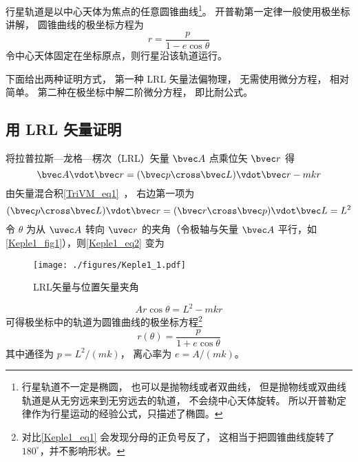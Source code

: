 

行星轨道是以中心天体为焦点的任意圆锥曲线\footnote{行星轨道不一定是椭圆， 也可以是抛物线或者双曲线， 但是抛物线或双曲线轨道是从无穷远来到无穷远去的轨道， 不会绕中心天体旋转。 所以开普勒定律作为行星运动的经验公式，只描述了椭圆。}。 开普勒第一定律一般使用极坐标讲解， 圆锥曲线的极坐标方程为
\begin{equation}\label{Keple1_eq1}
r = \frac{p}{1 - e \cos \theta }
\end{equation}
令中心天体固定在坐标原点，则行星沿该轨道运行。

下面给出两种证明方式， 第一种 LRL 矢量法偏物理， 无需使用微分方程， 相对简单。 第二种在极坐标中解二阶微分方程， 即比耐公式。

\subsection{用 LRL 矢量证明}

将拉普拉斯—龙格—楞次（LRL）矢量 $\bvec A$ 点乘位矢 $\bvec r$ 得
\begin{equation}\label{Keple1_eq2}
\bvec A \vdot \bvec r = (\bvec p \cross \bvec L)\vdot \bvec r - mkr
\end{equation}
由矢量混合积\autoref{TriVM_eq1}~， 右边第一项为
\begin{equation}
(\bvec p \cross \bvec L)\vdot \bvec r = (\bvec r \cross \bvec p)\vdot \bvec L = L^2
\end{equation}
令 $\theta$ 为从 $\uvec A$ 转向 $\uvec r$ 的夹角（令极轴与矢量 $\bvec A$ 平行，如\autoref{Keple1_fig1}），则\autoref{Keple1_eq2} 变为
\begin{figure}[ht]
\centering
\texttt{[image: ./figures/Keple1\_1.pdf]}
\caption{LRL矢量与位置矢量夹角} \label{Keple1_fig1}
\end{figure}
\begin{equation}
Ar\cos\theta = L^2 - mkr
\end{equation}
可得极坐标中的轨道为圆锥曲线的极坐标方程\footnote{对比\autoref{Keple1_eq1} 会发现分母的正负号反了， 这相当于把圆锥曲线旋转了 $180^\circ$，并不影响形状。}
\begin{equation}
r(\theta) = \frac{p}{1 + e\cos\theta}
\end{equation}
其中通径为 $p = L^2/(mk)$， 离心率为 $e = A/(mk)$。

